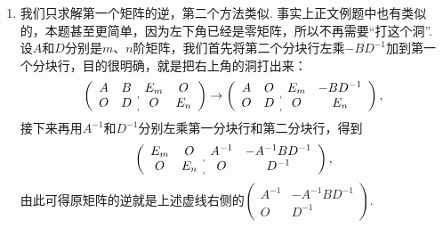 \begin{enumerate}
    \item 我们只求解第一个矩阵的逆，第二个方法类似. 事实上正文例题中也有类似的，本题甚至更简单，因为左下角已经是零矩阵，所以不再需要``打这个洞''. 设$A$和$D$分别是$m$、$n$阶矩阵，我们首先将第二个分块行左乘$-BD^{-1}$加到第一个分块行，目的很明确，就是把右上角的洞打出来：
          \[\left(\begin{array}{cc:cc}
                      A & B & E_m & O \\ O & D & O & E_n
                  \end{array}\right)\rightarrow\left(\begin{array}{cc:cc}
                      A & O & E_m & -BD^{-1} \\ O & D & O & E_n
                  \end{array}\right),\]
          接下来再用$A^{-1}$和$D^{-1}$分别左乘第一分块行和第二分块行，得到
          \[\left(\begin{array}{cc:cc}
                      E_m & O & A^{-1} & -A^{-1}BD^{-1} \\ O & E_n & O & D^{-1}
                  \end{array}\right),\]
          由此可得原矩阵的逆就是上述虚线右侧的$\begin{pmatrix}
                  A^{-1} & -A^{-1}BD^{-1} \\ O & D^{-1}
              \end{pmatrix}$.
\end{enumerate}

